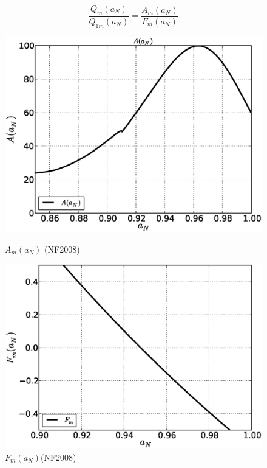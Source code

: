 \documentclass[11pt,oneside,a4paper,notitlepage]{article}
\begin{document}
\begin{equation}\label{eq:QbyQ1}
 \frac{Q_m(a_N)}{Q_{1m}(a_N)}=\frac{A_m(a_N)}{F_m(a_N)}
\end{equation}

\begin{figure}[h]
\begin{center}
\begin{minipage}[ht]{0.4\linewidth} 
 \centering
 \includegraphics[width=1.35\linewidth]{A.eps}
 \caption{$A_m(a_N)$ (NF2008)}
 \label{fig:Acompare}
\end{minipage}
\hfill
\begin{minipage}[ht]{0.4\linewidth} 
 \centering
 \includegraphics[width=1.35\linewidth]{Fm.eps}
 \caption{$F_m(a_N)$(NF2008)}
 \label{fig:DP}
\end{minipage}
\end{center}
\end{figure}
\end{document}
